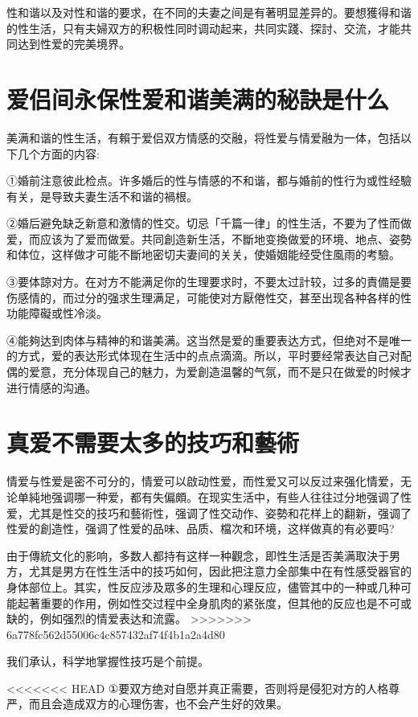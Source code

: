 \documentclass[12pt,UTF8]{ctexbook}
\begin{document}
性和谐以及对性和谐的要求，在不同的夫妻之间是有著明显差异的。要想獲得和谐的性生活，只有夫婦双方的积极性同时调动起来，共同实踐、探討、交流，才能共同达到性爱的完美境界。

\section{爱侣间永保性爱和谐美满的秘訣是什么}

美满和谐的性生活，有賴于爱侣双方情感的交融，将性爱与情爱融为一体，包括以下几个方面的内容:

①婚前注意彼此检点。许多婚后的性与情感的不和谐，都与婚前的性行为或性经驗有关，是导致夫妻生活不和谐的禍根。

②婚后避免缺乏新意和激情的性交。切忌「千篇一律」的性生活，不要为了性而做爱，而应该为了爱而做爱。共同創造新生活，不斷地变換做爱的环境、地点、姿勢和体位，这样做才可能不斷地密切夫妻间的关关，使婚姻能经受住風雨的考驗。

③要体諒对方。在对方不能满足你的生理要求时，不要太过計较，过多的責備是要伤感情的，而过分的强求生理满足，可能使对方厭倦性交，甚至出现各种各样的性功能障礙或性冷淡。

④能夠达到肉体与精神的和谐美满。这当然是爱的重要表达方式，但绝对不是唯一的方式，爱的表达形式体现在生活中的点点滴滴。所以，平时要经常表达自己对配偶的爱意，充分体现自己的魅力，为爱創造温馨的气氛，而不是只在做爱的时候才进行情感的沟通。

\section{真爱不需要太多的技巧和藝術}

情爱与性爱是密不可分的，情爱可以啟动性爱，而性爱又可以反过来强化情爱，无论单純地强调哪一种爱，都有失偏頗。在现实生活中，有些人往往过分地强调了性爱，尤其是性交的技巧和藝術性，强调了性交动作、姿勢和花样上的翻新，强调了性爱的創造性，强调了性爱的品味、品质、檔次和环境，这样做真的有必要吗?

由于傳統文化的影响，多数人都持有这样一种觀念，即性生活是否美满取決于男方，尤其是男方在性生活中的技巧如何，因此把注意力全部集中在有性感受器官的身体部位上。其实，性反应涉及眾多的生理和心理反应，儘管其中的一种或几种可能起著重要的作用，例如性交过程中全身肌肉的紧张度，但其他的反应也是不可或缺的，例如强烈的情爱表达和流露。
>>>>>>> 6a778fc562d55006c4c857432af74f4b1a2a4d80

我们承认，科学地掌握性技巧是个前提。

<<<<<<< HEAD
①要双方绝对自愿并真正需要，否则将是侵犯对方的人格尊严，而且会造成双方的心理伤害，也不会产生好的效果。
\end{document}
